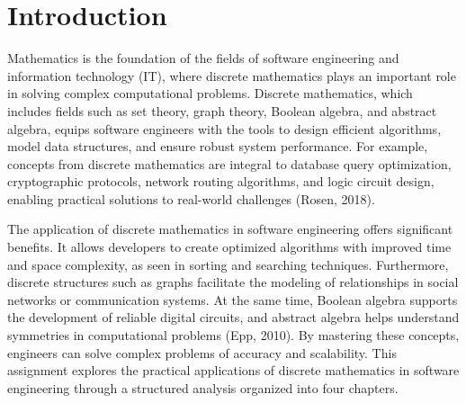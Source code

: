 \documentclass[12pt, a4paper, twoside]{report} %
\begin{document}


\tableofcontents 

\newpage


\section*{Introduction}
Mathematics is the foundation of the fields of software engineering and information technology (IT), where discrete mathematics plays an important role in solving complex computational problems. Discrete mathematics, which includes fields such as set theory, graph theory, Boolean algebra, and abstract algebra, equips software engineers with the tools to design efficient algorithms, model data structures, and ensure robust system performance. For example, concepts from discrete mathematics are integral to database query optimization, cryptographic protocols, network routing algorithms, and logic circuit design, enabling practical solutions to real-world challenges (Rosen, 2018).

The application of discrete mathematics in software engineering offers significant benefits. It allows developers to create optimized algorithms with improved time and space complexity, as seen in sorting and searching techniques. Furthermore, discrete structures such as graphs facilitate the modeling of relationships in social networks or communication systems. At the same time, Boolean algebra supports the development of reliable digital circuits, and abstract algebra helps understand symmetries in computational problems (Epp, 2010). By mastering these concepts, engineers can solve complex problems of accuracy and scalability. This assignment explores the practical applications of discrete mathematics in software engineering through a structured analysis organized into four chapters.

\end{document}
